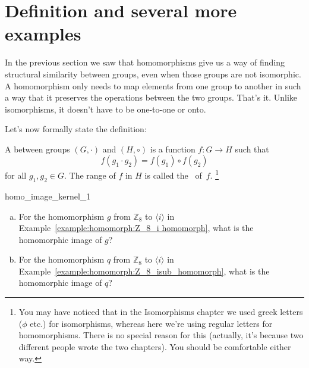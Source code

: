 \section{Definition and several more examples}\label{sec:homomorph:several}

In  the previous section we saw that homomorphisms give us a way of finding structural similarity between groups, even when those groups are not isomorphic.  A homomorphism only needs to  map elements from one group to another in such a way that it preserves the operations between the two groups.  That's it. Unlike isomorphisms, it doesn't have to be one-to-one or onto.  

Let's now formally state the definition:

\begin{defn} \label{homomorphism_def}
A
 between groups $(G, \cdot)$ and $(H, \circ)$ is a function $f :
G \rightarrow H$ such that  
\[
f( g_1 \cdot g_2 ) = f( g_1 ) \circ f( g_2 )
\]
for all $g_1, g_2 \in G$. The range of $f$ in $H$ is called the ~of~$f$.
\footnote{You may have noticed that in the Isomorphisms chapter we used greek letters ($\phi$ etc.) for isomorphisms, whereas here we're using regular letters for homomorphisms. There is no special reason for this (actually, it's because two different people wrote the two chapters).  You should be comfortable either way.}
 \end{defn}

\begin{exercise}{homo_image_kernel_1}

\begin{enumerate}[(a)]
\item
For the homomorphism $g$ from ${\mathbb Z}_8$ to $\langle i \rangle$ in Example~\ref{example:homomorph:Z_8_i homomorph}, what is the homomorphic image of $g$?
\item
For the homomorphism $q$ from ${\mathbb Z}_8$ to $\langle i \rangle$ in Example~\ref{example:homomorph:Z_8_isub_homomorph}, what is the homomorphic image of $q$?
\end{enumerate}
\end{exercise}  
 
 
